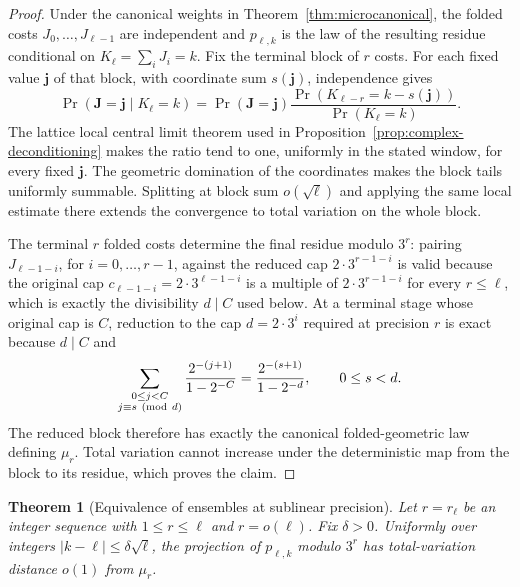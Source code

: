\documentclass[11pt]{article}
\newtheorem{theorem}{Theorem}[section]
\theoremstyle{remark}
\begin{document}
\begin{proof}
Under the canonical weights in Theorem~\ref{thm:microcanonical}, the
folded costs $J_0,\ldots,J_{\ell-1}$ are independent and
$p_{\ell,k}$ is the law of the resulting residue conditional on
$K_\ell=\sum_iJ_i=k$. Fix the terminal block of $r$ costs. For each
fixed value $\mathbf j$ of that block, with coordinate sum
$s(\mathbf j)$, independence gives
\[
 \Pr(\mathbf J=\mathbf j\mid K_\ell=k)
 =\Pr(\mathbf J=\mathbf j)
   \frac{\Pr(K_{\ell-r}=k-s(\mathbf j))}
        {\Pr(K_\ell=k)}.
\]
The lattice local central limit theorem used in
Proposition~\ref{prop:complex-deconditioning} makes the ratio tend to
one, uniformly in the stated window, for every fixed $\mathbf j$.
The geometric domination of the coordinates makes the block tails
uniformly summable. Splitting at block sum $o(\sqrt\ell)$ and applying
the same local estimate there extends the convergence to total
variation on the whole block.

The terminal $r$ folded costs determine the final residue modulo
$3^r$: pairing $J_{\ell-1-i}$, for $i=0,\ldots,r-1$, against the
reduced cap $2\cdot3^{r-1-i}$ is valid because the original cap
$c_{\ell-1-i}=2\cdot3^{\ell-1-i}$ is a multiple of $2\cdot3^{r-1-i}$
for every $r\le\ell$, which is exactly the divisibility $d\mid C$ used
below. At a terminal stage whose original cap is $C$, reduction to the
cap $d=2\cdot3^i$ required at precision $r$ is exact because $d\mid C$
and
\[
 \sum_{\substack{0\le j<C\\j\equiv s\ ({\rm mod}\ d)}}
 \frac{2^{-(j+1)}}{1-2^{-C}}
 =\frac{2^{-(s+1)}}{1-2^{-d}},\qquad 0\le s<d.
\]
The reduced block therefore has exactly the canonical folded-geometric
law defining $\mu_r$. Total variation cannot increase under the
deterministic map from the block to its residue, which proves the
claim.
\end{proof}

\begin{theorem}[Equivalence of ensembles at sublinear precision]
\label{thm:sublinear-precision-ensemble}
Let $r=r_\ell$ be an integer sequence with $1\le r\le\ell$ and
$r=o(\ell)$. Fix $\delta>0$. Uniformly over integers
$|k-\ell|\le\delta\sqrt\ell$, the projection of $p_{\ell,k}$ modulo
$3^r$ has total-variation distance $o(1)$ from $\mu_r$.
\end{theorem}
\end{document}
